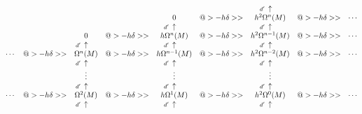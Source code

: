 \begin{equation}


\label{comp_d_h}


\begin{matrix}


\ & \ & \ & \ & \ & \ & \UP & \ & \ \\


%


\ & \ & \ & \ & 0 & @> {-h\delta}>> & h^2\Omega^{n}(M) &


@> {-h\delta}>> & \dotsb \\


%


\ & \ & \ & \ & \UP & \ & \UP & \ & \ \\


%


\ & \ & 0 & @>{-h\delta}>> & h\Omega^{n}(M) &  @>{-h\delta}>> &


h^2\Omega^{n-1}(M) &  @>{-h\delta}>> & \dotsb \\


%


\ & \ & \UP & \ & \UP & & \UP & & \\


%


\dotsb & @>{-h\delta}>> & \Omega^{n}(M) & @>{-h\delta}>> &


h\Omega^{n-1}(M) &  @>{-h\delta}>> & h^2\Omega^{n-2}(M) &


@>{-h\delta}>> & \dotsb\\


%


\ & \ & \UP  & \ & \UP & \ & \UP & & \\


%


& & \vdots & & \vdots & & \vdots & & \\


%


& & \UP & & \UP  & & \UP & & \\


%


\dotsb & @>{-h\delta}>> & \Omega^{2}(M) &  @>{-h\delta}>> &


h\Omega^{1}(M) & @>{-h\delta}>> & h^2\Omega^{0}(M) &


@>{-h\delta}>> & \dotsb\\


%


& & \UP  & & \UP  & & \UP & & \\


%



\end{matrix}
\end{equation}
